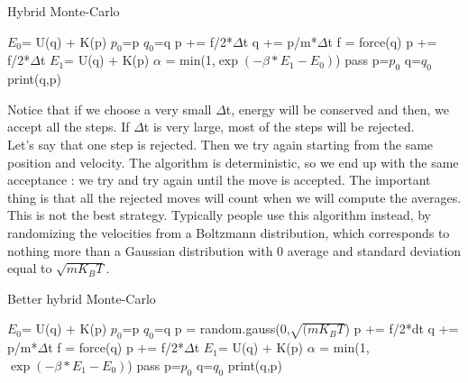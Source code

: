 \begin{algorithm}[H]
			\caption{Hybrid Monte-Carlo}
			\begin{algorithmic}[0]
				    \State $E_{0}$= U(q) + K(p)
				    \State $p_{0}$=p
				    \State $q_{0}$=q
				        \State p += f/2*$\Delta$t
				        \State q += p/m*$\Delta$t
				        \State f = force(q)
				        \State p += f/2*$\Delta$t
				    \EndFor
					\State $E_{1}$= U(q) + K(p)
					\State $\alpha$ = min(1,$\exp(-\beta * E_{1}-E_{0})$)
					    \State pass
				    \Else
				        \State p=$p_{0}$    
				        \State q=$q_{0}$ 
				    \EndIf
				\State print(q,p)    
				\EndFor
			\end{algorithmic}
		\end{algorithm}
Notice that if we choose a very small $\Delta$t, energy will be conserved and then, we accept all the steps. If $\Delta$t is very large, most of the steps will be rejected.\\
Let’s say that one step is rejected. Then we try again starting from the same position and velocity. The algorithm is deterministic, so we end up with the same acceptance : we try and try again until the move is accepted. The important thing is that all the rejected moves will count when we will compute the averages.\\
This is not the best strategy. Typically people use this algorithm instead, by randomizing the velocities from a Boltzmann distribution, which corresponds to nothing more than a Gaussian distribution with 0 average and standard deviation equal to $\sqrt{m K_{B}T}$.
\begin{algorithm}[H]
			\caption{Better hybrid Monte-Carlo}
			\begin{algorithmic}[0]
				    \State $E_{0}$= U(q) + K(p)
				    \State $p_{0}$=p
				    \State $q_{0}$=q
				    \State p = random.gauss(0,$\sqrt{(m K_{B}T}$)
				        \State p += f/2*dt
				        \State q += p/m*$\Delta$t
				        \State f = force(q)
				        \State p += f/2*$\Delta$t
				    \EndFor
					\State $E_{1}$= U(q) + K(p)
					\State $\alpha$ = min(1,$\exp(-\beta * E_{1}-E_{0})$)
					    pass
				    \Else
				        \State p=$p_{0}$    
				        \State q=$q_{0}$  
				    \EndIf
				\State print(q,p)    
				\EndFor
			\end{algorithmic}
		\end{algorithm}